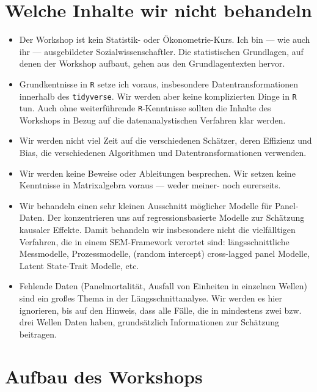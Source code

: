 \documentclass[]{book}
\begin{document}
\hypertarget{welche-inhalte-wir-nicht-behandeln}{%
\section{Welche Inhalte wir nicht behandeln}\label{welche-inhalte-wir-nicht-behandeln}}

\begin{itemize}
\item
  Der Workshop ist kein Statistik- oder Ökonometrie-Kurs. Ich bin --- wie auch ihr --- ausgebildeter Sozialwissenschaftler. Die statistischen Grundlagen, auf denen der Workshop aufbaut, gehen aus den Grundlagentexten \citep{bellExplainingFixedEffects2015, vaiseyWhatYouCan2017} hervor.
\item
  Grundkentnisse in \texttt{R} setze ich voraus, insbesondere Datentransformationen innerhalb des \texttt{tidyverse}. Wir werden aber keine komplizierten Dinge in \texttt{R} tun. Auch ohne weiterführende \texttt{R}-Kenntnisse sollten die Inhalte des Workshops in Bezug auf die datenanalystischen Verfahren klar werden.
\item
  Wir werden nicht viel Zeit auf die verschiedenen Schätzer, deren Effizienz und Bias, die verschiedenen Algorithmen und Datentransformationen verwenden.
\item
  Wir werden keine Beweise oder Ableitungen besprechen. Wir setzen keine Kenntnisse in Matrixalgebra voraus --- weder meiner- noch eurerseits.
\item
  Wir behandeln einen sehr kleinen Ausschnitt möglicher Modelle für Panel-Daten. Der konzentrieren uns auf regressionsbasierte Modelle zur Schätzung kausaler Effekte. Damit behandeln wir insbesondere nicht die vielfälltigen Verfahren, die in einem SEM-Framework verortet sind: längsschnittliche Messmodelle, Prozessmodelle, (random intercept) cross-lagged panel Modelle, Latent State-Trait Modelle, etc.
\item
  Fehlende Daten (Panelmortalität, Ausfall von Einheiten in einzelnen Wellen) sind ein großes Thema in der Längsschnittanalyse. Wir werden es hier ignorieren, bis auf den Hinweis, dass alle Fälle, die in mindestens zwei bzw. drei Wellen Daten haben, grundsätzlich Informationen zur Schätzung beitragen.
\end{itemize}

\hypertarget{aufbau-des-workshops}{%
\section{Aufbau des Workshops}\label{aufbau-des-workshops}}
\end{document}
